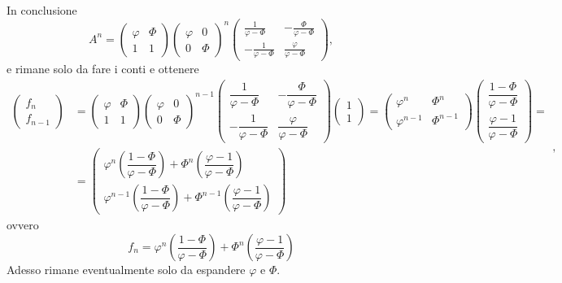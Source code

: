 \documentclass{article}     %
\begin{document}
In conclusione
\[A^n = \begin{pmatrix} \varphi &\Phi\\1&1 \end{pmatrix} \begin{pmatrix} \varphi &0\\0&\Phi \end{pmatrix}^n \begin{pmatrix} \frac{1}{\varphi -\Phi}&-\frac{\Phi}{\varphi -\Phi}\\- \frac{1}{\varphi - \Phi}&\frac{\varphi}{\varphi -\Phi} \end{pmatrix},\]
e rimane solo da fare i conti e ottenere
\[\renewcommand{\arraystretch}{2}\begin{aligned}\begin{pmatrix} f_n\\f_{n - 1} \end{pmatrix} &= \begin{pmatrix} \varphi &\Phi\\1&1 \end{pmatrix} \begin{pmatrix} \varphi &0\\0&\Phi \end{pmatrix}^{n - 1} \begin{pmatrix} \dfrac{1}{\varphi -\Phi}&-\dfrac{\Phi}{\varphi -\Phi}\\- \dfrac{1}{\varphi - \Phi}&\dfrac{\varphi}{\varphi -\Phi} \end{pmatrix} \begin{pmatrix} 1 \\ 1 \end{pmatrix} = \begin{pmatrix} \varphi^n&\Phi^n\\ \varphi^{n - 1}&\Phi^{n - 1} \end{pmatrix}  \begin{pmatrix} \dfrac{1 -\Phi}{\varphi -\Phi} \\ \dfrac{\varphi - 1}{\varphi -\Phi} \end{pmatrix} =\\&= \begin{pmatrix} \varphi^n\left( \dfrac{1 -\Phi}{\varphi -\Phi}\right) +\Phi^n\left( \dfrac{\varphi - 1}{\varphi - \Phi} \right) \\ \varphi^{n - 1}\left( \dfrac{1 -\Phi}{\varphi -\Phi}\right) +\Phi^{n - 1}\left( \dfrac{\varphi - 1}{\varphi - \Phi} \right)\end{pmatrix}  \end{aligned},\]
ovvero 
\[f_n = \varphi^n\left( \dfrac{1 -\Phi}{\varphi -\Phi}\right) +\Phi^n\left( \dfrac{\varphi - 1}{\varphi - \Phi} \right)\]
Adesso rimane eventualmente solo da espandere $\varphi$ e $\Phi$.
\end{document}
